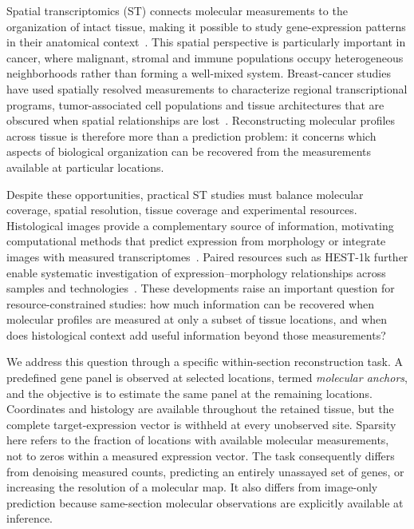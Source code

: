 Spatial transcriptomics (ST) connects molecular measurements to the organization of intact tissue, making it possible to study gene-expression patterns in their anatomical context~\cite{stahl2016}. This spatial perspective is particularly important in cancer, where malignant, stromal and immune populations occupy heterogeneous neighborhoods rather than forming a well-mixed system. Breast-cancer studies have used spatially resolved measurements to characterize regional transcriptional programs, tumor-associated cell populations and tissue architectures that are obscured when spatial relationships are lost~\cite{andersson2021,wu2021,bassiouni2023}. Reconstructing molecular profiles across tissue is therefore more than a prediction problem: it concerns which aspects of biological organization can be recovered from the measurements available at particular locations.

Despite these opportunities, practical ST studies must balance molecular coverage, spatial resolution, tissue coverage and experimental resources. Histological images provide a complementary source of information, motivating computational methods that predict expression from morphology or integrate images with measured transcriptomes~\cite{he2020,monjo2022,bergenstrahle2022,istar2024}. Paired resources such as HEST-1k further enable systematic investigation of expression--morphology relationships across samples and technologies~\cite{jaume2024}. These developments raise an important question for resource-constrained studies: how much information can be recovered when molecular profiles are measured at only a subset of tissue locations, and when does histological context add useful information beyond those measurements?

We address this question through a specific within-section reconstruction task. A predefined gene panel is observed at selected locations, termed \emph{molecular anchors}, and the objective is to estimate the same panel at the remaining locations. Coordinates and histology are available throughout the retained tissue, but the complete target-expression vector is withheld at every unobserved site. Sparsity here refers to the fraction of locations with available molecular measurements, not to zeros within a measured expression vector. The task consequently differs from denoising measured counts, predicting an entirely unassayed set of genes, or increasing the resolution of a molecular map. It also differs from image-only prediction because same-section molecular observations are explicitly available at inference.

